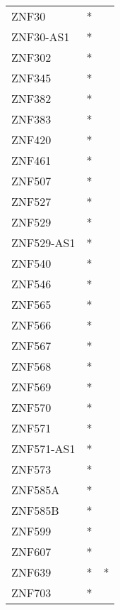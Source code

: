 \begin{longtable}{lcc}
ZNF30            &              * &            \\
ZNF30-AS1        &              * &            \\
ZNF302           &              * &            \\
ZNF345           &              * &            \\
ZNF382           &              * &            \\
ZNF383           &              * &            \\
ZNF420           &              * &            \\
ZNF461           &              * &            \\
ZNF507           &              * &            \\
ZNF527           &              * &            \\
ZNF529           &              * &            \\
ZNF529-AS1       &              * &            \\
ZNF540           &              * &            \\
ZNF546           &              * &            \\
ZNF565           &              * &            \\
ZNF566           &              * &            \\
ZNF567           &              * &            \\
ZNF568           &              * &            \\
ZNF569           &              * &            \\
ZNF570           &              * &            \\
ZNF571           &              * &            \\
ZNF571-AS1       &              * &            \\
ZNF573           &              * &            \\
ZNF585A          &              * &            \\
ZNF585B          &              * &            \\
ZNF599           &              * &            \\
ZNF607           &              * &            \\
ZNF639           &              * &          * \\
ZNF703           &              * &            \\

\end{longtable}
